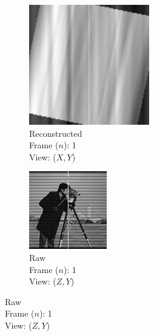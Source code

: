 \documentclass{osa-article}
\begin{document}
\begin{figure}
\begin{subfigure}[t]{0.2\linewidth}
  \end{subfigure}\hfill
  \begin{subfigure}[t]{0.2\linewidth}
    \centering
    \includegraphics[width=\linewidth]{./figures/results/3D_python/no_drift_zelda/1/xy_recon}\caption{Reconstructed\\Frame (\(n\)): 1\\View: (\(X,Y\))}
  \end{subfigure}\hfill
  \begin{subfigure}[t]{0.2\linewidth}
    \centering
    \includegraphics[width=\linewidth]{./figures/results/3D_python/no_drift_zelda/1/zx}\caption{Raw\\Frame (\(n\)): 1\\View: (\(Z,Y\))}

\end{subfigure}
\end{figure}
\end{document}
